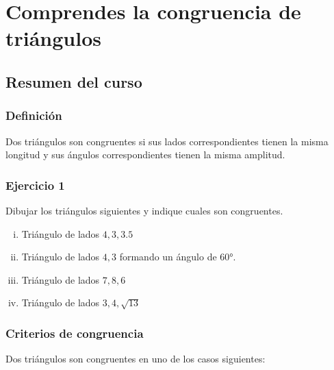 \chapter{Comprendes la congruencia de triángulos}

\section{Resumen del curso}

\subsection{Definición}

Dos triángulos son congruentes si sus lados correspondientes tienen la misma
longitud y sus ángulos correspondientes tienen la misma amplitud. 

\subsection{Ejercicio 1}

Dibujar los triángulos siguientes y indique cuales son congruentes.

\begin{enumerate}[(i)]
  \item Triángulo de lados $4, 3, 3.5$
  \item Triángulo de lados $4, 3$ formando un ángulo de 60°.
  \item Triángulo de lados $7, 8, 6$
  \item Triángulo de lados $3, 4, \sqrt{13}$
\end{enumerate}

\subsection{Criterios de congruencia}

Dos triángulos son congruentes en uno de los casos siguientes:


